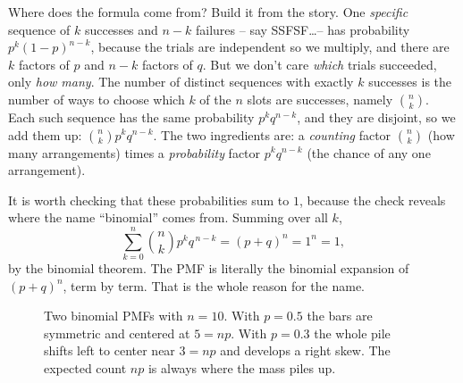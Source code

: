 \begin{whybox}
Where does the formula come from? Build it from the story. One \emph{specific}
sequence of $k$ successes and $n-k$ failures -- say SSFSF\dots -- has probability
$p^k (1-p)^{n-k}$, because the trials are independent so we multiply, and there
are $k$ factors of $p$ and $n-k$ factors of $q$. But we don't care \emph{which}
trials succeeded, only \emph{how many}. The number of distinct sequences with
exactly $k$ successes is the number of ways to choose which $k$ of the $n$ slots
are successes, namely $\binom{n}{k}$. Each such sequence has the same probability
$p^k q^{n-k}$, and they are disjoint, so we add them up:
$\binom{n}{k} p^k q^{n-k}$. The two ingredients are: a \emph{counting} factor
$\binom{n}{k}$ (how many arrangements) times a \emph{probability} factor
$p^k q^{n-k}$ (the chance of any one arrangement).
\end{whybox}

It is worth checking that these probabilities sum to $1$, because the check
reveals where the name ``binomial'' comes from. Summing over all $k$,
\[
  \sum_{k=0}^{n} \binom{n}{k} p^{k} q^{\,n-k} = (p + q)^{n} = 1^{n} = 1,
\]
by the binomial theorem. The PMF is literally the binomial expansion of
$(p+q)^n$, term by term. That is the whole reason for the name.

\begin{figure}[H]
\centering
{}
\caption{Two binomial PMFs with $n=10$. With $p=0.5$ the bars are symmetric and
centered at $5 = np$. With $p=0.3$ the whole pile shifts left to center near
$3 = np$ and develops a right skew. The expected count $np$ is always where the
mass piles up.}
\label{ch07:fig-binom-pmf}
\end{figure}

